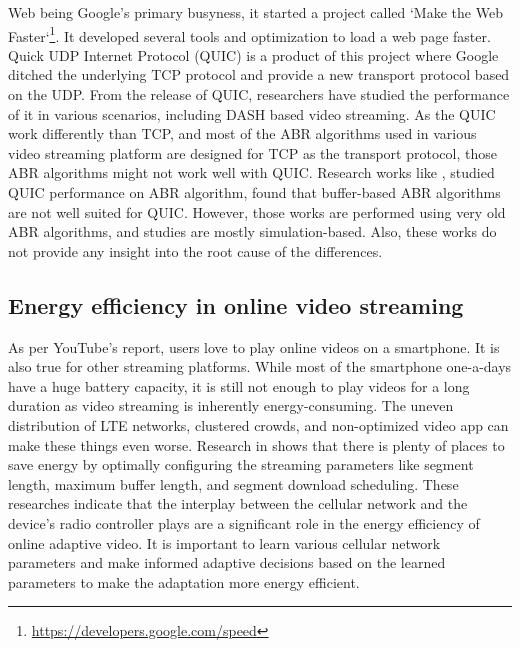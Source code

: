 Web being Google's primary busyness, it started a project called `Make the Web Faster`\footnote{\url{https://developers.google.com/speed}}. It developed several tools and optimization to load a web page faster. Quick UDP Internet Protocol (QUIC) is a product of this project where Google ditched the underlying TCP protocol and provide a new transport protocol based on the UDP. From the release of QUIC, researchers have studied the performance of it in various scenarios, including DASH based video streaming. As the QUIC work differently than TCP, and most of the ABR algorithms used in various video streaming platform are designed for TCP as the transport protocol, those ABR algorithms might not work well with QUIC. Research works like \cite{bhat2018improving,van2018empirical}, studied QUIC performance on ABR algorithm, found that buffer-based ABR algorithms are not well suited for QUIC. However, those works are performed using very old ABR algorithms, and studies are mostly simulation-based. Also, these works do not provide any insight into the root cause of the differences.

\subsection{Energy efficiency in online video streaming}
As per YouTube's report, users love to play online videos on a smartphone. It is also true for other streaming platforms. While most of the smartphone one-a-days have a huge battery capacity, it is still not enough to play videos for a long duration as video streaming is inherently energy-consuming. The uneven distribution of LTE networks, clustered crowds, and non-optimized video app can make these things even worse. Research in  shows that there is plenty of places to save energy by optimally configuring the streaming parameters like segment length, maximum buffer length, and segment download scheduling. These researches indicate that the interplay between the cellular network and the device's radio controller plays are a significant role in the energy efficiency of online adaptive video. It is important to learn various cellular network parameters and make informed adaptive decisions based on the learned parameters to make the adaptation more energy efficient.


